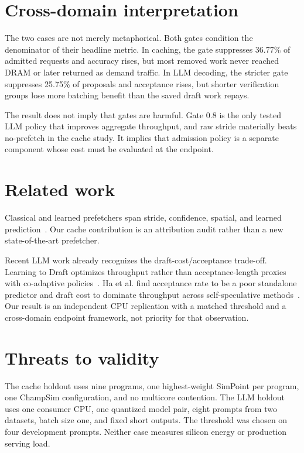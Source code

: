 \documentclass[conference]{IEEEtran}
\begin{document}
\section{Cross-domain interpretation}
The two cases are not merely metaphorical. Both gates condition the denominator
of their headline metric. In caching, the gate suppresses 36.77\% of admitted
requests and accuracy rises, but most removed work never reached DRAM or later
returned as demand traffic. In LLM decoding, the stricter gate suppresses
25.75\% of proposals and acceptance rises, but shorter verification groups
lose more batching benefit than the saved draft work repays.

The result does not imply that gates are harmful. Gate 0.8 is the only tested
LLM policy that improves aggregate throughput, and raw stride materially beats
no-prefetch in the cache study. It implies that admission policy is a separate
component whose cost must be evaluated at the endpoint.

\section{Related work}
Classical and learned prefetchers span stride, confidence, spatial, and learned
prediction~\cite{stride,spp,bingo,learning}. Our cache contribution is an
attribution audit rather than a new state-of-the-art prefetcher.

Recent LLM work already recognizes the draft-cost/acceptance trade-off.
Learning to Draft optimizes throughput rather than acceptance-length proxies
with co-adaptive policies~\cite{ltd}. Ha et al. find acceptance rate to be a
poor standalone predictor and draft cost to dominate throughput across
self-speculative methods~\cite{char}.
Our result is an independent CPU replication with a matched threshold and a
cross-domain endpoint framework, not priority for that observation.

\section{Threats to validity}
The cache holdout uses nine programs, one highest-weight SimPoint per program,
one ChampSim configuration, and no multicore contention. The LLM holdout uses
one consumer CPU, one quantized model pair, eight prompts from two datasets,
batch size one, and fixed short outputs. The threshold was chosen on four
development prompts. Neither case measures silicon energy or production
serving load.
\end{document}
